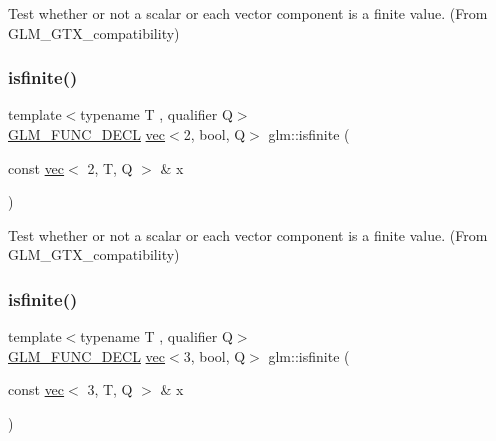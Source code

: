 Test whether or not a scalar or each vector component is a finite value. (From G\+L\+M\+\_\+\+G\+T\+X\+\_\+compatibility) 

\mbox{\label{group__gtx__compatibility_ga8e76dc3e406ce6a4155c2b12a2e4b084}} 
\subsubsection{\texorpdfstring{isfinite()}{isfinite()}\hspace{0.1cm}{\footnotesize\ttfamily [3/5]}}
{\footnotesize\ttfamily template$<$typename T , qualifier Q$>$ \\
\hyperlink{setup_8hpp_ab2d052de21a70539923e9bcbf6e83a51}{G\+L\+M\+\_\+\+F\+U\+N\+C\+\_\+\+D\+E\+CL} \hyperlink{structglm_1_1vec}{vec}$<$2, bool, Q$>$ glm\+::isfinite (\begin{DoxyParamCaption}\item[{const \hyperlink{structglm_1_1vec}{vec}$<$ 2, T, Q $>$ \&}]{x }\end{DoxyParamCaption})}



Test whether or not a scalar or each vector component is a finite value. (From G\+L\+M\+\_\+\+G\+T\+X\+\_\+compatibility) 

\mbox{\label{group__gtx__compatibility_ga929ef27f896d902c1771a2e5e150fc97}} 
\subsubsection{\texorpdfstring{isfinite()}{isfinite()}\hspace{0.1cm}{\footnotesize\ttfamily [4/5]}}
{\footnotesize\ttfamily template$<$typename T , qualifier Q$>$ \\
\hyperlink{setup_8hpp_ab2d052de21a70539923e9bcbf6e83a51}{G\+L\+M\+\_\+\+F\+U\+N\+C\+\_\+\+D\+E\+CL} \hyperlink{structglm_1_1vec}{vec}$<$3, bool, Q$>$ glm\+::isfinite (\begin{DoxyParamCaption}\item[{const \hyperlink{structglm_1_1vec}{vec}$<$ 3, T, Q $>$ \&}]{x }\end{DoxyParamCaption})}



